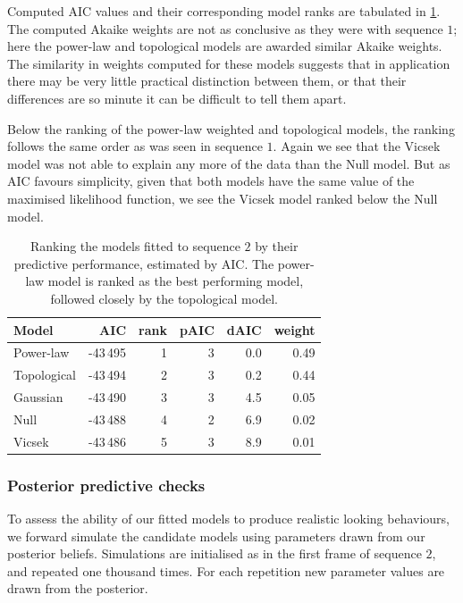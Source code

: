 Computed AIC values and their corresponding model ranks are tabulated in
\cref{tab:aic_seq2}. The computed Akaike weights are not as conclusive as they
were with sequence $1$; here the power-law and topological models are awarded
similar Akaike weights. The similarity in weights computed for these models
suggests that in application there may be very little practical distinction
between them, or that their differences are so minute it can be difficult to
tell them apart.

Below the ranking of the power-law weighted and topological models, the ranking
follows the same order as was seen in sequence $1$. Again we see that the
Vicsek model was not able to explain any more of the data than the Null model.
But as AIC favours simplicity, given that both models have the same value of
the maximised likelihood function, we see the Vicsek model ranked below the
Null model.

\begin{table}[tbp]
\begin{tabular}{@{}lrrrrr@{}}
\toprule
Model                       &        AIC & rank & pAIC & dAIC & weight \\
\midrule
Power-law                   & -43\,495 &    1 &  3 &  0.0 &   0.49 \\
Topological                 & -43\,494 &    2 &  3 &  0.2 &   0.44 \\
Gaussian                    & -43\,490 &    3 &  3 &  4.5 &   0.05 \\
Null                        & -43\,488 &    4 &  2 &  6.9 &   0.02 \\
Vicsek                      & -43\,486 &    5 &  3 &  8.9 &   0.01 \\
\bottomrule
\end{tabular}
\caption{Ranking the models fitted to sequence $2$ by their predictive
  performance, estimated by AIC. The power-law model is ranked as the best
  performing model, followed closely by the topological model.}
\label{tab:aic_seq2}
\end{table}

\subsubsection{Posterior predictive checks}

To assess the ability of our fitted models to produce realistic looking
behaviours, we forward simulate the candidate models using parameters drawn
from our posterior beliefs. Simulations are initialised as in the first frame
of sequence $2$, and repeated one thousand times. For each repetition new
parameter values are drawn from the posterior.

